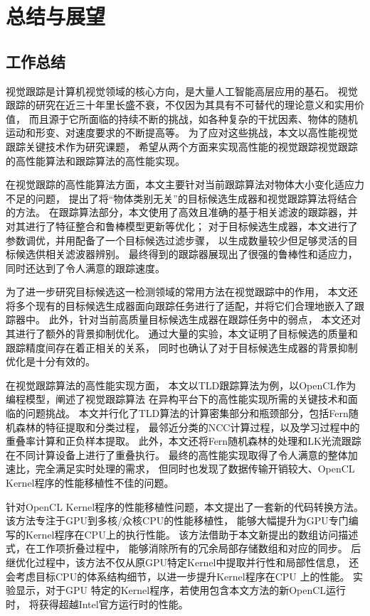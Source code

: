 \chapter{总结与展望}
\section{工作总结}
视觉跟踪是计算机视觉领域的核心方向，是大量人工智能高层应用的基石。
视觉跟踪的研究在近三十年里长盛不衰，不仅因为其具有不可替代的理论意义和实用价值，
而且源于它所面临的持续不断的挑战，如各种复杂的干扰因素、物体的随机运动和形变、对速度要求的不断提高等。
为了应对这些挑战，本文以高性能视觉跟踪关键技术作为研究课题，
希望从两个方面来实现高性能的视觉跟踪\pozhehao 视觉跟踪的高性能算法和跟踪算法的高性能实现。

在视觉跟踪的高性能算法方面，本文主要针对当前跟踪算法对物体大小变化适应力不足的问题，
提出了将``物体类别无关''的目标候选生成器和视觉跟踪算法将结合的方法。
在跟踪算法部分，本文使用了高效且准确的基于相关滤波的跟踪器，并对其进行了特征整合和鲁棒模型更新等优化；
对于目标候选生成器，本文进行了参数调优，并用配备了一个目标候选过滤步骤，
以生成数量较少但足够灵活的目标候选供相关滤波器辨别。
最终得到的跟踪器展现出了很强的鲁棒性和适应力，同时还达到了令人满意的跟踪速度。

为了进一步研究目标候选这一检测领域的常用方法在视觉跟踪中的作用，
本文还将多个现有的目标候选生成器面向跟踪任务进行了适配，并将它们合理地嵌入了跟踪器中。
此外，针对当前高质量目标候选生成器在跟踪任务中的弱点，
本文还对其进行了额外的背景抑制优化。
通过大量的实验，本文证明了目标候选的质量和跟踪精度间存在着正相关的关系，
同时也确认了对于目标候选生成器的背景抑制优化是十分有效的。

在视觉跟踪算法的高性能实现方面，
本文以TLD跟踪算法为例，以OpenCL作为编程模型，阐述了视觉跟踪算法
在异构平台下的高性能实现所需的关键技术和面临的问题挑战。
本文并行化了TLD算法的计算密集部分和瓶颈部分，包括Fern随机森林的特征提取和分类过程，
最邻近分类的NCC计算过程，以及学习过程中的重叠率计算和正负样本提取。
此外，本文还将Fern随机森林的处理和LK光流跟踪在不同计算设备上进行了重叠执行。
最终的高性能实现取得了令人满意的整体加速比，完全满足实时处理的需求，
但同时也发现了数据传输开销较大、OpenCL Kernel程序的性能移植性不佳的问题。

针对OpenCL Kernel程序的性能移植性问题，本文提出了一套新的代码转换方法。
该方法专注于GPU到多核/众核CPU的性能移植性，
能够大幅提升为GPU专门编写的Kernel程序在CPU上的执行性能。
该方法借助于本文新提出的数组访问描述式，在工作项折叠过程中，
能够消除所有的冗余局部存储数组和对应的同步。
后继优化过程中，该方法不仅从原GPU特定Kernel中提取并行性和局部性信息，
还会考虑目标CPU的体系结构细节，以进一步提升Kernel程序在CPU 上的性能。
实验显示，对于GPU 特定的Kernel程序，若使用包含本文方法的新OpenCL运行时，
将获得超越Intel官方运行时的性能。

